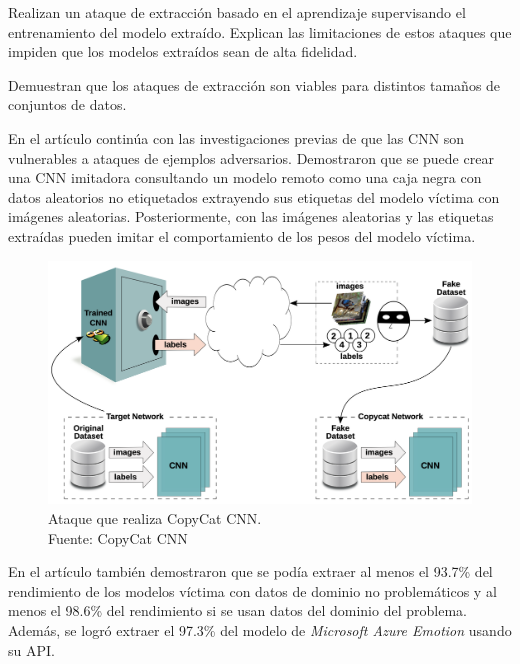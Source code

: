 Realizan un ataque de extracción basado en el aprendizaje supervisando el entrenamiento del modelo extraído. Explican las limitaciones de estos ataques que impiden que los modelos extraídos sean de alta fidelidad.

Demuestran que los ataques de extracción son viables para distintos tamaños de conjuntos de datos.

En el artículo \cite{Correia_Silva_2018} continúa con las investigaciones previas de que las \gls{CNN} son vulnerables a ataques de ejemplos adversarios. Demostraron que se puede crear una \gls{CNN} imitadora consultando un modelo remoto como una caja negra con datos aleatorios no etiquetados extrayendo sus etiquetas del modelo víctima con imágenes aleatorias. Posteriormente, con las imágenes aleatorias y las etiquetas extraídas pueden imitar el comportamiento de los pesos del modelo víctima.

\begin{figure}[H]
    \centering
    \includegraphics[width=0.75\linewidth]{figures/chapter02/copycatCNN.png}
    \caption{Ataque que realiza CopyCat CNN. \\Fuente: CopyCat CNN \cite{Correia_Silva_2018}}
    \label{fig:copycatcnn}
\end{figure}

En el artículo también demostraron que se podía extraer al menos el 93.7\% del rendimiento de los modelos víctima con datos de dominio no problemáticos y al menos el 98.6\% del rendimiento si se usan datos del dominio del problema. Además, se logró extraer el 97.3\% del modelo de \textit{Microsoft Azure Emotion} usando su API.

